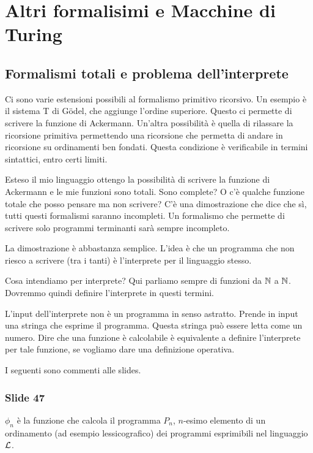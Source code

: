 \chapter{Altri formalisimi e Macchine di Turing}

\section{Formalismi totali e problema dell'interprete}

Ci sono varie estensioni possibili al formalismo primitivo ricorsivo. Un esempio è il sistema T di
Gödel, che aggiunge l'ordine superiore. Questo ci permette di scrivere la funzione di Ackermann.
Un'altra possibilità è quella di rilassare la ricorsione primitiva permettendo una ricorsione che
permetta di andare in ricorsione su ordinamenti ben fondati. Questa condizione è verificabile in
termini sintattici, entro certi limiti.

Esteso il mio linguaggio ottengo la possibilità di scrivere la funzione di Ackermann e le mie
funzioni sono totali. Sono complete? O c'è qualche funzione totale che posso pensare ma non
scrivere? C'è una dimostrazione che dice che sì, tutti questi formalismi saranno incompleti. Un
formalismo che permette di scrivere solo programmi terminanti sarà sempre incompleto.

La dimostrazione è abbastanza semplice. L'idea è che un programma che non riesco a scrivere (tra
i tanti) è l'interprete per il linguaggio stesso. 

Cosa intendiamo per interprete? Qui parliamo sempre di funzioni da $\mathbb{N}$ a $\mathbb{N}$. Dovremmo quindi
definire l'interprete in questi termini.

L'input dell'interprete non è un programma in senso astratto. Prende in input una stringa che
esprime il programma. Questa stringa può essere letta come un numero. Dire che una funzione è
calcolabile è equivalente a definire l'interprete per tale funzione, se vogliamo dare una
definizione operativa.

I seguenti sono commenti alle slides.

\subsection{Slide 47}

$\phi_{n}$ è la funzione che calcola il programma $P_{n}$, $n$-esimo elemento di un ordinamento (ad
esempio lessicografico) dei programmi esprimibili nel linguaggio $\mathcal{L}$.

